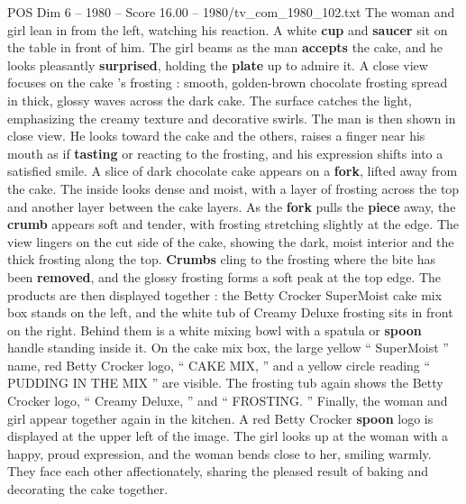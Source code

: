 \begin{textsample}{POS Dim 6 – 1980 – Score 16.00 – 1980/tv\_com\_1980\_102.txt}
The woman and girl lean in from the left, watching his reaction.
A white \textbf{cup} and \textbf{saucer} sit on the table in front of him.
The girl beams as the man \textbf{accepts} the cake, and he looks pleasantly \textbf{surprised}, holding the \textbf{plate} up to admire it.
A close view focuses on the cake ’s frosting : smooth, golden-brown chocolate frosting spread in thick, glossy waves across the dark cake.
The surface catches the light, emphasizing the creamy texture and decorative swirls.
The man is then shown in close view.
He looks toward the cake and the others, raises a finger near his mouth as if \textbf{tasting} or reacting to the frosting, and his expression shifts into a satisfied smile.
A slice of dark chocolate cake appears on a \textbf{fork}, lifted away from the cake.
The inside looks dense and moist, with a layer of frosting across the top and another layer between the cake layers.
As the \textbf{fork} pulls the \textbf{piece} away, the \textbf{crumb} appears soft and tender, with frosting stretching slightly at the edge.
The view lingers on the cut side of the cake, showing the dark, moist interior and the thick frosting along the top. \textbf{Crumbs} cling to the frosting where the bite has been \textbf{removed}, and the glossy frosting forms a soft peak at the top edge.
The products are then displayed together : the Betty Crocker SuperMoist cake mix box stands on the left, and the white tub of Creamy Deluxe frosting sits in front on the right.
Behind them is a white mixing bowl with a spatula or \textbf{spoon} handle standing inside it.
On the cake mix box, the large yellow “ SuperMoist ” name, red Betty Crocker logo, “ CAKE MIX, ” and a yellow circle reading “ PUDDING IN THE MIX ” are visible.
The frosting tub again shows the Betty Crocker logo, “ Creamy Deluxe, ” and “ FROSTING. ” Finally, the woman and girl appear together again in the kitchen.
A red Betty Crocker \textbf{spoon} logo is displayed at the upper left of the image.
The girl looks up at the woman with a happy, proud expression, and the woman bends close to her, smiling warmly.
They face each other affectionately, sharing the pleased result of baking and decorating the cake together.

\end{textsample}
